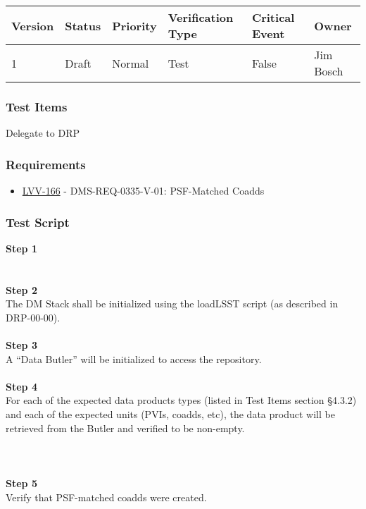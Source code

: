 \begin{longtable}[]{@{}llllll@{}}
\toprule
Version & Status & Priority & Verification Type & Critical Event &
Owner\tabularnewline
\midrule
\endhead
1 & Draft & Normal & Test & False & Jim Bosch\tabularnewline
\bottomrule
\end{longtable}

\hypertarget{test-items-168}{%
\subsubsection{Test Items}\label{test-items-168}}

Delegate to DRP

\hypertarget{requirements-169}{%
\subsubsection{Requirements}\label{requirements-169}}

\begin{itemize}
\tightlist
\item
  \href{https://jira.lsstcorp.org/browse/LVV-166}{LVV-166} -
  DMS-REQ-0335-V-01: PSF-Matched Coadds
\end{itemize}

\hypertarget{test-script-169}{%
\subsubsection{Test Script}\label{test-script-169}}

\textbf{Step 1}\\
~\\
~\\
\textbf{Step 2}\\
The DM Stack shall be initialized using the loadLSST script (as
described in DRP-00-00).\\
~\\
\textbf{Step 3}\\
A ``Data Butler'' will be initialized to access the repository.\\
~\\
\textbf{Step 4}\\
For each of the expected data products types (listed in Test Items
section §4.3.2) and each of the expected units (PVIs, coadds, etc), the
data product will be retrieved from the Butler and verified to be
non-empty.\\
~\\
~\\
~\\
\textbf{Step 5}\\
Verify that PSF-matched coadds were created.\\
~\\

